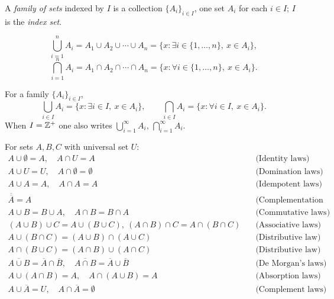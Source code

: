 \documentclass[11pt]{article}
\begin{document}
\begin{definition}
A \emph{family of sets} indexed by $I$ is a collection $\{A_i\}_{i \in I}$, one set $A_i$ for each $i \in I$; $I$ is the \emph{index set}.
\end{definition}

\begin{definition}
\[
\bigcup_{i=1}^n A_i = A_1 \cup A_2 \cup \cdots \cup A_n = \{x : \exists i \in \{1,\dots,n\},\ x\in A_i\},
\]
\[
\bigcap_{i=1}^n A_i = A_1 \cap A_2 \cap \cdots \cap A_n = \{x : \forall i \in \{1,\dots,n\},\ x\in A_i\}.
\]
\end{definition}

\begin{definition}
For a family $\{A_i\}_{i\in I}$,
\[
\bigcup_{i \in I} A_i = \{x : \exists i \in I,\ x \in A_i\}, \qquad
\bigcap_{i \in I} A_i = \{x : \forall i \in I,\ x \in A_i\}.
\]
When $I = \mathbb{Z}^+$ one also writes $\displaystyle\bigcup_{i=1}^{\infty} A_i$, $\displaystyle\bigcap_{i=1}^{\infty} A_i$.
\end{definition}

\begin{theorem}
For sets $A,B,C$ with universal set $U$:
\begin{align*}
A \cup \emptyset = A,\quad A \cap U = A &\quad\text{(Identity laws)}\\
A \cup U = U,\quad A \cap \emptyset = \emptyset &\quad\text{(Domination laws)}\\
A \cup A = A,\quad A \cap A = A &\quad\text{(Idempotent laws)}\\
\overline{\overline{A}} = A &\quad\text{(Complementation law)}\\
A \cup B = B \cup A,\quad A \cap B = B \cap A &\quad\text{(Commutative laws)}\\
(A\cup B)\cup C = A\cup(B\cup C),\ (A\cap B)\cap C = A\cap(B\cap C) &\quad\text{(Associative laws)}\\
A\cup(B\cap C) = (A\cup B)\cap(A\cup C) &\quad\text{(Distributive law)}\\
A\cap(B\cup C) = (A\cap B)\cup(A\cap C) &\quad\text{(Distributive law)}\\
\overline{A\cup B} = \overline A\cap\overline B,\quad \overline{A\cap B}=\overline A\cup\overline B &\quad\text{(De Morgan's laws)}\\
A\cup(A\cap B) = A,\quad A\cap(A\cup B)=A &\quad\text{(Absorption laws)}\\
A \cup \overline A = U,\quad A \cap \overline A = \emptyset &\quad\text{(Complement laws)}
\end{align*}
\end{theorem}
\end{document}
